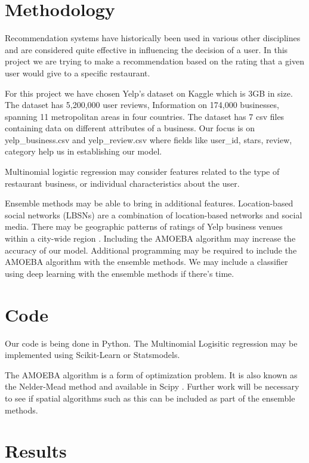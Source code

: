 \documentclass[12pt]{article}
\begin{document}
\section{Methodology}

Recommendation systems have historically been used in various other disciplines and
are considered quite effective in influencing the decision of a user. In this project
we are trying to make a recommendation based on the rating that a given user would give
to a specific restaurant.

For this project we have chosen Yelp’s dataset on Kaggle \cite{YelpData59:online}
which is 3GB in size. The dataset
has 5,200,000 user reviews, Information on 174,000 businesses, spanning 11 metropolitan
areas in four countries. The dataset has 7 csv files containing data on different
attributes of a business. Our focus is on yelp\_business.csv and yelp\_review.csv where
fields like user\_id, stars, review, category help us in establishing our model.

Multinomial logistic regression may consider features related to the type of restaurant
business, or individual characteristics about the user.

Ensemble methods may be able to bring in additional features. Location-based social
networks (LBSNs) are a combination of location-based networks and social media. There
may be geographic patterns of ratings of Yelp business venues within a city-wide
region \cite{sun2017spatial}. Including the AMOEBA algorithm may increase the
accuracy of our model. Additional programming may be required to include the AMOEBA
algorithm with the ensemble methods. We may include a classifier using deep
learning with the ensemble methods if there's time.

\section{Code}

Our code is being done in Python. The Multinomial Logisitic regression may be
implemented using Scikit-Learn or Statsmodels. 

The AMOEBA algorithm is a form of optimization problem. It is also known
as the Nelder-Mead method and available in Scipy \cite{Optimiza90:online}. Further
work will be necessary to see if spatial algorithms such as this can be
included as part of the ensemble methods. 

\section{Results}
\end{document}
